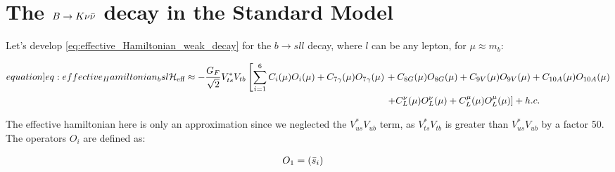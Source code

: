 \section{The $B \to K \nu \Bar{\nu}$ decay in the Standard Model} \label{sec:bknn_SM}

Let's develop \cref{eq:effective_Hamiltonian_weak_decay} for the $b \to s l l$ decay, where $l$ can be any lepton, for $\mu \approx m_b$:

\begin{align}\label[equation]{eq:effective_Hamiltonian_bsl}
    \notag \mathcal{H}_{\text{eff}} \approx - \frac{G_F}{\sqrt{2}} V^*_{ts}V_{tb} \left[ \sum_{i = 1}^6 C_i(\mu) O_i(\mu) 
    + C_{7\gamma}(\mu)O_{7\gamma}(\mu) \right.
    & + C_{8 G}(\mu)O_{8 G}(\mu)
    + C_{9 V}(\mu)O_{9 V}(\mu)
    + C_{10 A}(\mu)O_{10 A}(\mu) \\
    & \left. + C_{L}^{\nu}(\mu)O_{L}^{\nu}(\mu)
    + C_{L}^{\mu}(\mu)O_{L}^{\mu}(\mu)
     \right] + h.c.
\end{align}

The effective hamiltonian here is only an approximation since we neglected the $V^*_{us}V_{ub}$ term, as $V^*_{ts}V_{tb}$ is greater than $V^*_{us}V_{ub}$ by a factor 50.
The operators $O_i$ are defined as:

\begin{align}
    O_1 &=  (\Bar{s}_i)
\end{align}